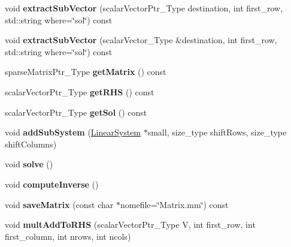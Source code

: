 \begin{DoxyCompactItemize}
void {\bfseries extract\+Sub\+Vector} (scalar\+Vector\+Ptr\+\_\+\+Type destination, int first\+\_\+row, std\+::string where=\char`\"{}sol\char`\"{}) const
\item 
\mbox{\label{classLinearSystem_a5296d829ff117f6c70e17f277f7c0f43}} 
void {\bfseries extract\+Sub\+Vector} (scalar\+Vector\+\_\+\+Type \&destination, int first\+\_\+row, std\+::string where=\char`\"{}sol\char`\"{}) const
\item 
\mbox{\label{classLinearSystem_a0e0a75162a3c1ebd08e5f49e43e05d6e}} 
sparse\+Matrix\+Ptr\+\_\+\+Type {\bfseries get\+Matrix} () const
\item 
\mbox{\label{classLinearSystem_a83abf03b51dee2aac566f87fa3473bc0}} 
scalar\+Vector\+Ptr\+\_\+\+Type {\bfseries get\+R\+HS} () const
\item 
\mbox{\label{classLinearSystem_a3ef7e07ffe4a2eeac49dbd8d48792df4}} 
scalar\+Vector\+Ptr\+\_\+\+Type {\bfseries get\+Sol} () const
\item 
\mbox{\label{classLinearSystem_a07e9e5d259c3b3d3ddf71e4de1410bc9}} 
void {\bfseries add\+Sub\+System} (\hyperlink{classLinearSystem}{Linear\+System} $\ast$small, size\+\_\+type shift\+Rows, size\+\_\+type shift\+Columns)
\item 
\mbox{\label{classLinearSystem_a477274ae086a3c851ae9b01e4dc4f327}} 
void {\bfseries solve} ()
\item 
\mbox{\label{classLinearSystem_ae840d279eec2092a822f3f2e4f5bd091}} 
void {\bfseries compute\+Inverse} ()
\item 
\mbox{\label{classLinearSystem_a1f17216367dfbc35e631fca351a4e71c}} 
void {\bfseries save\+Matrix} (const char $\ast$nomefile=\char`\"{}Matrix.\+mm\char`\"{}) const
\item 
\mbox{\label{classLinearSystem_afdff2fbf87f2428ade63a702eb6ef77f}} 
void {\bfseries mult\+Add\+To\+R\+HS} (scalar\+Vector\+Ptr\+\_\+\+Type V, int first\+\_\+row, int first\+\_\+column, int nrows, int ncols)
\item 

\end{DoxyCompactItemize}
